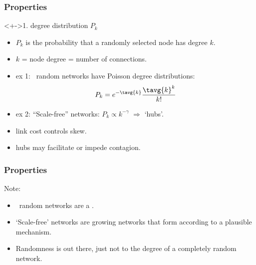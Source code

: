 \begin{frame}
  \frametitle{Properties}

  \begin{block}<+->{1. degree distribution $P_k$}
    \begin{itemize}
    \item<+->
      $P_k$ is the probability that a randomly selected
      node has degree $k$.
    \item<+->
      $k$ = node degree = number of connections.
    \item<+->
      \alert{ex 1:}
      \erdosrenyi\ random networks have Poisson degree distributions: \\
      $$ P_k = e^{-\tavg{k}} \frac{\tavg{k}^k}{k!} $$
    \item<+->
      \alert{ex 2:}
      \alert{``Scale-free'' networks:}
      $P_k \propto k^{-\gamma}$ $\Rightarrow$ `hubs'.
    \item<+->
      link cost controls skew.
    \item<+->
      hubs may facilitate or impede contagion.
    \end{itemize}
  \end{block}
 
\end{frame}

\begin{frame}
  \frametitle{Properties}

  \begin{block}{Note:}
    \begin{itemize}
    \item<1->
      \erdosrenyi\ random networks are a .
    \item<2->
      `Scale-free' networks are \alert{growing networks} that form
      according to a \alert{plausible mechanism}.
    \item<3-> Randomness is out there, just not to the degree of
       a completely random network.
    \end{itemize}
  \end{block}

\end{frame}

